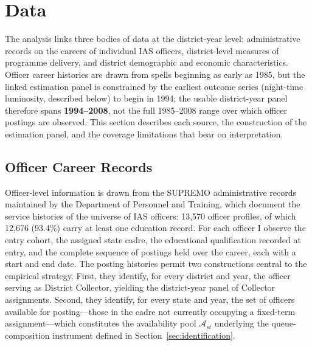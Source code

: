 
\section{Data}
\label{sec:data}

The analysis links three bodies of data at the district-year level: administrative
records on the careers of individual IAS officers, district-level measures of
programme delivery, and district demographic and economic characteristics. Officer
career histories are drawn from spells beginning as early as 1985, but the linked
estimation panel is constrained by the earliest outcome series (night-time
luminosity, described below) to begin in 1994; the usable district-year panel
therefore spans \textbf{1994--2008}, not the full 1985--2008 range over which officer
postings are observed. This section describes each source, the construction of the
estimation panel, and the coverage limitations that bear on interpretation.

\subsection{Officer Career Records}
\label{sec:data-officers}

Officer-level information is drawn from the SUPREMO administrative records
maintained by the Department of Personnel and Training, which document the service
histories of the universe of IAS officers: 13,570 officer profiles, of which 12,676
(93.4\%) carry at least one education record. For each officer I observe the entry
cohort, the assigned state cadre, the educational qualification recorded at entry,
and the complete sequence of postings held over the career, each with a start and
end date. The posting histories permit two constructions central to the empirical
strategy. First, they identify, for every district and year, the officer serving as
District Collector, yielding the district-year panel of Collector assignments.
Second, they identify, for every state and year, the set of officers available for
posting---those in the cadre not currently occupying a fixed-term assignment---which
constitutes the availability pool $\mathcal{A}_{st}$ underlying the queue-composition
instrument defined in Section~\ref{sec:identification}.

